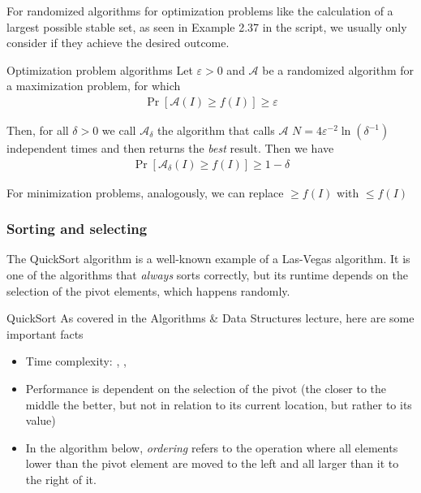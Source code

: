 For randomized algorithms for optimization problems like the calculation of a largest possible stable set, as seen in Example 2.37 in the script, we usually only consider if they achieve the desired outcome.

\begin{theorem}[]{Optimization problem algorithms}
    Let $\varepsilon > 0$ and $\mathcal{A}$ be a randomized algorithm for a maximization problem, for which
    \begin{align*}
        \Pr[\mathcal{A}(I) \geq f(I)] \geq \varepsilon
    \end{align*}

    Then, for all $\delta > 0$ we call $\mathcal{A}_{\delta}$ the algorithm that calls $\mathcal{A}$ $N = 4 \varepsilon^{-2} \ln(\delta^{-1})$ independent times and then returns the \textit{best} result. Then we have
    \begin{align*}
        \Pr[\mathcal{A}_{\delta}(I) \geq f(I)] \geq 1 - \delta
    \end{align*}
\end{theorem}
For minimization problems, analogously, we can replace $\geq f(I)$ with $\leq f(I)$


\subsubsection{Sorting and selecting}
The QuickSort algorithm is a well-known example of a Las-Vegas algorithm. It is one of the algorithms that \textit{always} sorts correctly, but its runtime depends on the selection of the pivot elements, which happens randomly.

\begin{recall}[]{QuickSort}
    As covered in the Algorithms \& Data Structures lecture, here are some important facts
    \begin{itemize}
        \item Time complexity: , , 
        \item Performance is dependent on the selection of the pivot (the closer to the middle the better, but not in relation to its current location, but rather to its value)
        \item In the algorithm below, \textit{ordering} refers to the operation where all elements lower than the pivot element are moved to the left and all larger than it to the right of it.
    \end{itemize}
\end{recall}

